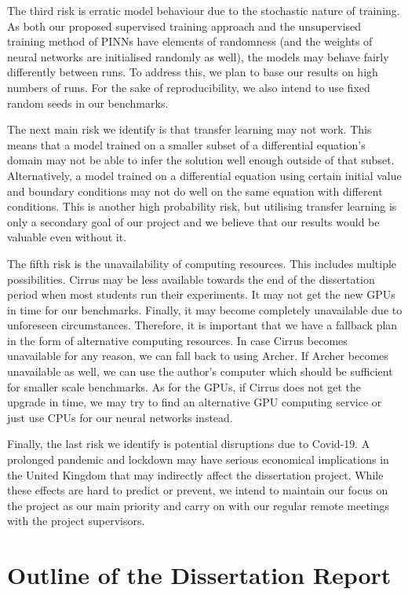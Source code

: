 \documentclass{article}
\begin{document}
The third risk is erratic model behaviour due to the stochastic nature of training. As both our proposed supervised training approach and the unsupervised training method of PINNs have elements of randomness (and the weights of neural networks are initialised randomly as well), the models may behave fairly differently between runs. To address this, we plan to base our results on high numbers of runs. For the sake of reproducibility, we also intend to use fixed random seeds in our benchmarks.

The next main risk we identify is that transfer learning may not work. This means that a model trained on a smaller subset of a differential equation's domain may not be able to infer the solution well enough outside of that subset. Alternatively, a model trained on a differential equation using certain initial value and boundary conditions may not do well on the same equation with different conditions. This is another high probability risk, but utilising transfer learning is only a secondary goal of our project and we believe that our results would be valuable even without it.

The fifth risk is the unavailability of computing resources. This includes multiple possibilities. Cirrus may be less available towards the end of the dissertation period when most students run their experiments. It may not get the new GPUs in time for our benchmarks. Finally, it may become completely unavailable due to unforeseen circumstances. Therefore, it is important that we have a fallback plan in the form of alternative computing resources. In case Cirrus becomes unavailable for any reason, we can fall back to using Archer. If Archer becomes unavailable as well, we can use the author's computer which should be sufficient for smaller scale benchmarks. As for the GPUs, if Cirrus does not get the upgrade in time, we may try to find an alternative GPU computing service or just use CPUs for our neural networks instead.

Finally, the last risk we identify is potential disruptions due to Covid-19. A prolonged pandemic and lockdown may have serious economical implications in the United Kingdom that may indirectly affect the dissertation project. While these effects are hard to predict or prevent, we intend to maintain our focus on the project as our main priority and carry on with our regular remote meetings with the project supervisors.

\section{Outline of the Dissertation Report}
\end{document}
